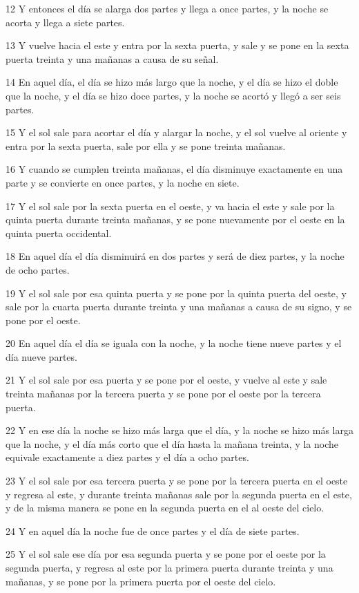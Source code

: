 \par 12 Y entonces el día se alarga dos partes y llega a once partes, y la noche se acorta y llega a siete partes.
\par 13 Y vuelve hacia el este y entra por la sexta puerta, y sale y se pone en la sexta puerta treinta y una mañanas a causa de su señal.
\par 14 En aquel día, el día se hizo más largo que la noche, y el día se hizo el doble que la noche, y el día se hizo doce partes, y la noche se acortó y llegó a ser seis partes.
\par 15 Y el sol sale para acortar el día y alargar la noche, y el sol vuelve al oriente y entra por la sexta puerta, sale por ella y se pone treinta mañanas.
\par 16 Y cuando se cumplen treinta mañanas, el día disminuye exactamente en una parte y se convierte en once partes, y la noche en siete.
\par 17 Y el sol sale por la sexta puerta en el oeste, y va hacia el este y sale por la quinta puerta durante treinta mañanas, y se pone nuevamente por el oeste en la quinta puerta occidental.
\par 18 En aquel día el día disminuirá en dos partes y será de diez partes, y la noche de ocho partes.
\par 19 Y el sol sale por esa quinta puerta y se pone por la quinta puerta del oeste, y sale por la cuarta puerta durante treinta y una mañanas a causa de su signo, y se pone por el oeste.
\par 20 En aquel día el día se iguala con la noche, y la noche tiene nueve partes y el día nueve partes.
\par 21 Y el sol sale por esa puerta y se pone por el oeste, y vuelve al este y sale treinta mañanas por la tercera puerta y se pone por el oeste por la tercera puerta.
\par 22 Y en ese día la noche se hizo más larga que el día, y la noche se hizo más larga que la noche, y el día más corto que el día hasta la mañana treinta, y la noche equivale exactamente a diez partes y el día a ocho partes.
\par 23 Y el sol sale por esa tercera puerta y se pone por la tercera puerta en el oeste y regresa al este, y durante treinta mañanas sale por la segunda puerta en el este, y de la misma manera se pone en la segunda puerta en el al oeste del cielo.
\par 24 Y en aquel día la noche fue de once partes y el día de siete partes.
\par 25 Y el sol sale ese día por esa segunda puerta y se pone por el oeste por la segunda puerta, y regresa al este por la primera puerta durante treinta y una mañanas, y se pone por la primera puerta por el oeste del cielo.

